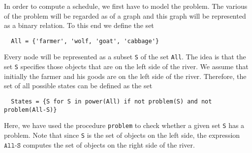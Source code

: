 \noindent
In order to compute a schedule, we first have to model the problem.  The various  of the problem will
be regarded as  of a graph and this graph will be represented as a binary relation.
To this end we define the set
\begin{verbatim}
  All = {'farmer', 'wolf, 'goat', 'cabbage'}
\end{verbatim}
Every node will be represented as a subset \texttt{S} of the set \texttt{All}.  The idea is that the set \texttt{S}
specifies those objects that are on the left side of the river.  We assume that initially the farmer and his goods
are on the left side of the river. 
Therefore, the set of all possible states can be defined as the set
\begin{verbatim}
  States = {S for S in power(All) if not problem(S) and not problem(All-S)}
\end{verbatim}
Here, we have used the procedure \texttt{problem} to check whether a given set \texttt{S} has a problem. 
Note that since \texttt{S} is the set of objects on the left side, the expression $\texttt{All-S}$
computes the set of objects on the right side of the river.

